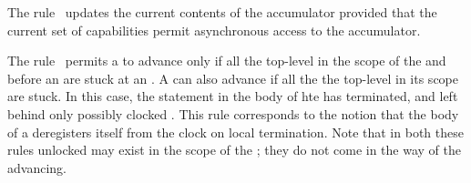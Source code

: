 The rule~ updates the current contents of the
accumulator provided that the current set of capabilities permit
asynchronous access to the accumulator.

The rule~ permits a  to advance
only if all the top-level  in the scope of the
 and before an  are stuck at an
. A  can also advance if all the
the top-level  in its scope are stuck. In this
case, the statement in the body of hte  has
terminated, and left behind only possibly clocked . This
rule corresponds to the notion that the body of a  deregisters itself from the clock on local termination.
Note that in both these rules unlocked  may exist in the
scope of the ; they do not come in the way of the
 advancing.

